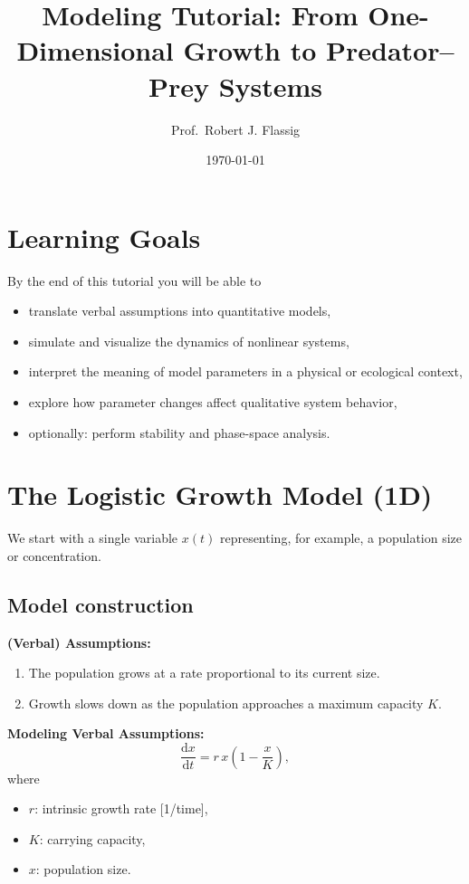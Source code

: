 \documentclass[11pt,a4paper]{article}
\title{Modeling Tutorial: From One-Dimensional Growth to Predator--Prey Systems}
\author{Prof.\ Robert J. Flassig}
\date{\today}
\newcommand{\dd}{\mathrm{d}}
\begin{document}
\maketitle

\section{Learning Goals}
By the end of this tutorial you will be able to
\begin{itemize}[leftmargin=*,itemsep=0.3em]
  \item translate verbal assumptions into quantitative models,
  \item simulate and visualize the dynamics of nonlinear systems,
  \item interpret the meaning of model parameters in a physical or ecological context,
  \item explore how parameter changes affect qualitative system behavior,
  \item optionally: perform stability and phase-space analysis.
\end{itemize}

\section{The Logistic Growth Model (1D)}
We start with a single variable $x(t)$ representing, for example, a population size or concentration.

\subsection{Model construction}
\textbf{(Verbal) Assumptions:}
\begin{enumerate}[label=\textbf{A\arabic*},leftmargin=*]
  \item The population grows at a rate proportional to its current size.
  \item Growth slows down as the population approaches a maximum capacity $K$.
\end{enumerate}


\textbf{Modeling Verbal Assumptions:}
\[
\frac{\dd x}{\dd t} = r\,x\!\left(1-\frac{x}{K}\right),
\]
where
\begin{itemize}[leftmargin=2em,itemsep=0.2em]
  \item $r$: intrinsic growth rate [1/time],
  \item $K$: carrying capacity,
  \item $x$: population size.
\end{itemize}
\end{document}
